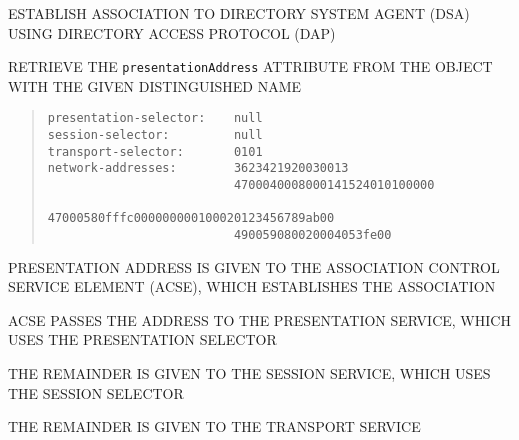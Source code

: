 \begin{bwslide}

\begin{nrtc}
\item	ESTABLISH ASSOCIATION TO DIRECTORY SYSTEM AGENT (DSA)
	USING DIRECTORY ACCESS PROTOCOL (DAP)

\item	RETRIEVE THE \verb"presentationAddress" ATTRIBUTE FROM
	THE OBJECT WITH THE GIVEN DISTINGUISHED NAME
\end{nrtc}

\begin{quote}\small\begin{verbatim}
presentation-selector:    null
session-selector:         null
transport-selector:       0101
network-addresses:        3623421920030013
                          4700040008000141524010100000
                          47000580fffc000000000100020123456789ab00
                          490059080020004053fe00
\end{verbatim}\end{quote}
\end{bwslide}


\begin{bwslide}

\begin{nrtc}
\item	PRESENTATION ADDRESS IS GIVEN TO THE ASSOCIATION CONTROL SERVICE
	ELEMENT (ACSE), WHICH ESTABLISHES THE ASSOCIATION

\item	ACSE PASSES THE ADDRESS TO THE PRESENTATION SERVICE,
	WHICH USES THE PRESENTATION SELECTOR

\item	THE REMAINDER IS GIVEN TO THE SESSION SERVICE,
	WHICH USES THE SESSION SELECTOR

\item	THE REMAINDER IS GIVEN TO THE TRANSPORT SERVICE
\end{nrtc}
\end{bwslide}


